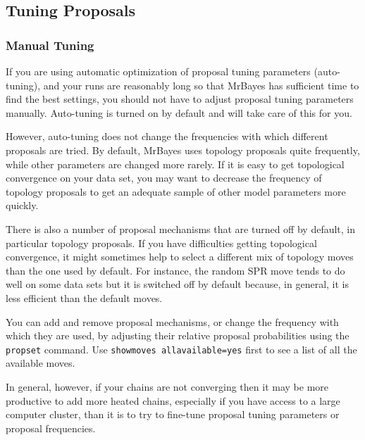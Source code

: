 \documentclass[12pt]{book}
\begin{document}
\subsection{Tuning Proposals}

\subsubsection{Manual Tuning}

If you are using automatic optimization of proposal tuning parameters (auto-tuning), and your runs
are reasonably long so that MrBayes has sufficient time to find the best settings, you should not
have to adjust proposal tuning parameters manually. Auto-tuning is turned on by default and will
take care of this for you.

However, auto-tuning does not change the frequencies with which different proposals are tried. By
default, MrBayes uses topology proposals quite frequently, while other parameters are changed more
rarely. If it is easy to get topological convergence on your data set, you may want to decrease the
frequency of topology proposals to get an adequate sample of other model parameters more quickly.

There is also a number of proposal mechanisms that are turned off by default, in particular
topology proposals. If you have difficulties getting topological convergence, it might sometimes
help to select a different mix of topology moves than the one used by default. For instance, the
random SPR move tends to do well on some data sets but it is switched off by default because, in
general, it is less efficient than the default moves.

You can add and remove proposal mechanisms, or change the frequency with which they are used, by
adjusting their relative proposal probabilities using the \texttt{propset} command. Use
\texttt{showmoves allavailable=yes} first to see a list of all the available moves.

In general, however, if your chains are not converging then it may be more productive to add more
heated chains, especially if you have access to a large computer cluster, than it is to try to
fine-tune proposal tuning parameters or proposal frequencies.

\end{document}
